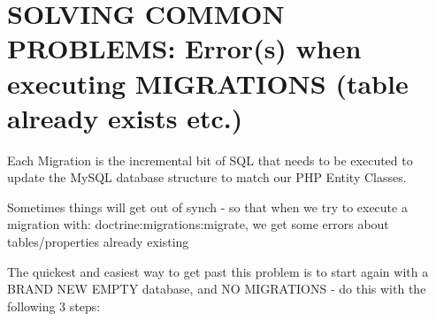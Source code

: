 \documentclass[a4paperpaper,openright]{book}
\begin{document}
\hypertarget{solving-common-problems-errors-when-executing-migrations-table-already-exists-etc.}{%
\section{SOLVING COMMON PROBLEMS: Error(s) when executing MIGRATIONS
(table already exists
etc.)}\label{solving-common-problems-errors-when-executing-migrations-table-already-exists-etc.}}

Each Migration is the incremental bit of SQL that needs to be executed
to update the MySQL database structure to match our PHP Entity Classes.

Sometimes things will get out of synch - so that when we try to execute
a migration with: doctrine:migrations:migrate, we get some errors about
tables/properties already existing

The quickest and easiest way to get past this problem is to start again
with a BRAND NEW EMPTY database, and NO MIGRATIONS - do this with the
following 3 steps:
\end{document}
